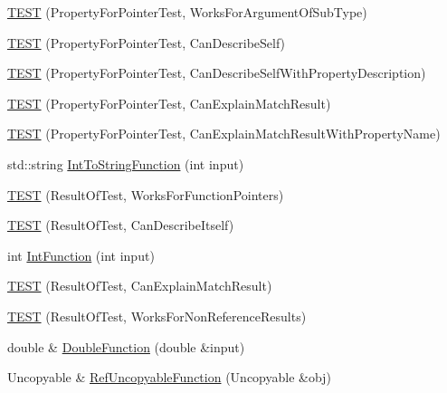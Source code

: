 \begin{DoxyCompactItemize}
\item 
\mbox{\hyperlink{namespacetesting_1_1gmock__matchers__test_a4c2f4b483550e2e70b09eea3836b83e0}{T\+E\+ST}} (Property\+For\+Pointer\+Test, Works\+For\+Argument\+Of\+Sub\+Type)
\item 
\mbox{\hyperlink{namespacetesting_1_1gmock__matchers__test_a064fc5dd5ca0106e8ed0fbc483472186}{T\+E\+ST}} (Property\+For\+Pointer\+Test, Can\+Describe\+Self)
\item 
\mbox{\hyperlink{namespacetesting_1_1gmock__matchers__test_a8c0578e07cfe031fa9de3ed3e5bde34a}{T\+E\+ST}} (Property\+For\+Pointer\+Test, Can\+Describe\+Self\+With\+Property\+Description)
\item 
\mbox{\hyperlink{namespacetesting_1_1gmock__matchers__test_a1a7e2a9641a06e492d58c75d900330d3}{T\+E\+ST}} (Property\+For\+Pointer\+Test, Can\+Explain\+Match\+Result)
\item 
\mbox{\hyperlink{namespacetesting_1_1gmock__matchers__test_a09471d531d0bbeaca60cb850dfe6f33e}{T\+E\+ST}} (Property\+For\+Pointer\+Test, Can\+Explain\+Match\+Result\+With\+Property\+Name)
\item 
std\+::string \mbox{\hyperlink{namespacetesting_1_1gmock__matchers__test_a94cad49187e6a3cc41d3ea59903214cf}{Int\+To\+String\+Function}} (int input)
\item 
\mbox{\hyperlink{namespacetesting_1_1gmock__matchers__test_a5aea17c7d3dd74cbc0cbf181b3a9e5f8}{T\+E\+ST}} (Result\+Of\+Test, Works\+For\+Function\+Pointers)
\item 
\mbox{\hyperlink{namespacetesting_1_1gmock__matchers__test_a1b5240d2272b679d7e3035554c2c5688}{T\+E\+ST}} (Result\+Of\+Test, Can\+Describe\+Itself)
\item 
int \mbox{\hyperlink{namespacetesting_1_1gmock__matchers__test_a6e957b9dcda1186c6274a8895d1514b5}{Int\+Function}} (int input)
\item 
\mbox{\hyperlink{namespacetesting_1_1gmock__matchers__test_ab7fe283b2955ca8bb11b2984a08eef33}{T\+E\+ST}} (Result\+Of\+Test, Can\+Explain\+Match\+Result)
\item 
\mbox{\hyperlink{namespacetesting_1_1gmock__matchers__test_a86f01e29ee48050d401fceca21d1041e}{T\+E\+ST}} (Result\+Of\+Test, Works\+For\+Non\+Reference\+Results)
\item 
double \& \mbox{\hyperlink{namespacetesting_1_1gmock__matchers__test_a48350ba4c1ce65694ec07e9c1c49a452}{Double\+Function}} (double \&input)
\item 
Uncopyable \& \mbox{\hyperlink{namespacetesting_1_1gmock__matchers__test_aa6f7dd285163d5880cfd6685bec8cab4}{Ref\+Uncopyable\+Function}} (Uncopyable \&obj)

\end{DoxyCompactItemize}
